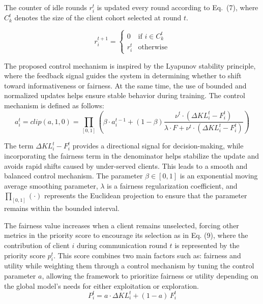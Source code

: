 \documentclass[pdflatex,sn-mathphys-num,oneside]{sn-jnl}%
\theoremstyle{thmstyleone}%
\theoremstyle{thmstyletwo}%
\theoremstyle{thmstylethree}%
\begin{document}
The counter of idle rounds $r_i^t$ is updated every round according to Eq.~(7), where $C_k^t$ denotes the size of the client cohort selected at round $t$.

\begin{equation}
r_i^{t+1} =
\begin{cases}
0 & \text{if } i \in C_k^t  \\
r_i^t & \text{otherwise}
\end{cases}
\label{eq:idle_update}
\end{equation}

The proposed control mechanism is inspired by the Lyapunov stability principle, where the feedback signal guides the system in determining whether to shift toward informativeness or fairness. At the same time, the use of bounded and normalized updates helps ensure stable behavior during training. The control mechanism is defined as follows:
\begin{equation}
a_i^t = clip(a,1,0) = \prod_{[0,1]}
\left(
\beta \cdot a_i^{t-1} + (1-\beta)
\frac{
\nu^t \cdot (\Delta KL_i^t - F_i^t)
}{
\lambda \cdot F + \nu^t \cdot (\Delta KL_i^t - F_i^t)
}
\right)
\end{equation}


The term $\Delta KL_i^t - F_i^t$ provides a directional signal for decision-making, while incorporating the fairness term in the denominator helps stabilize the update and avoids rapid shifts caused by under-served clients. This leads to a smooth and balanced control mechanism. The parameter $\beta \in [0,1]$ is an exponential moving average smoothing parameter, $\lambda$ is a fairness regularization coefficient, and $\prod_{[0,1]}(\cdot)$ represents the Euclidean projection to ensure that the parameter remains within the bounded interval.

The fairness value increases when a client remains unselected, forcing other metrics in the priority score to encourage its selection as in Eq. (9), where the contribution of client $i$ during communication round $t$ is represented by the priority score $p_i^t$. This score combines two main factors such as: fairness and utility while weighting them through a control mechanism by tuning the control parameter $a$, allowing the framework to prioritize fairness or utility depending on the global model’s needs for either exploitation or exploration.
\begin{equation}
P_i^t = a \cdot \Delta KL_i^t + (1 - a)\, F_i^t
\label{eq:priority}
\end{equation}
\end{document}
